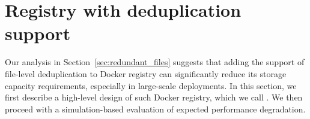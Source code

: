 \section{Registry with deduplication support}
\label{sec:file_adressable}

Our analysis in Section~\ref{sec:redundant_files} suggests that adding the
support of file-level deduplication to Docker registry can significantly reduce
its storage capacity requirements, especially in large-scale deployments.
%
In this section, we first describe a high-level design of such Docker registry,
which we call \emph{\sysname}.
%
We then proceed with a simulation-based evaluation of expected performance
degradation.






